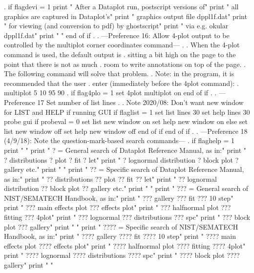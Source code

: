 .
if flagdevi = 1
   print "      After a Dataplot run, postscript versions of"
   print "      all graphics are captured in Dataplot's"
   print "      graphics output file     dppl1f.dat"
   print "      for viewing (and conversion to pdf) by ghostscript"
   print "      via e.g.    okular dppl1f.dat"
   print " "
end of if
.
. ---Preference 16: Allow 4-plot output to be controlled by the    multiplot corner coordinates    command---
.
.    When the 4-plot command is used, the default output is
.    sitting a bit high on the page to the point that there is not as much
.    room to write annotations on top of the page.
.    The following command will solve that problem.
.    Note: in the program, it is recommended that the user
.          enter (immediately before the 4plot command):
.             multiplot 5 10 95 90
.
if flag4plo = 1
   set 4plot multiplot on
end of if
.
. ---Preference 17 Set number of list lines
.
.    Note 2020/08: Don't want new window for LIST and HELP if running GUI
if flaglist = 1
   set list lines 30
   set help lines 30
   probe gui
   if probeval = 0
      set list new window on
      set help new window on
   else
      set list new window off
      set help new window off
   end of if
end of if
.
. ---Preference 18 (4/9/18): Note the question-mark-based search commands---
.
if flaghelp = 1
   print " "
   print "      ? = General  search of Dataplot Reference Manual, as in:"
   print "          ? distributions   ? plot   ? fit   ? let"
   print "          ? lognormal distribution   ? block plot   ? gallery   etc."
   print " "
   print "     ?? = Specific search of Dataplot Reference Manual, as in:"
   print "          ?? distributions   ?? plot   ?? fit   ?? let"
   print "          ?? lognormal distribution    ?? block plot   ?? gallery   etc."
   print " "
   print "    ??? = General  search of NIST/SEMATECH Handbook, as in:"
   print "          ??? gallery   ??? fit   ??? 10 step"
   print "          ??? main effects plot   ??? effects plot"
   print "          ??? halfnormal plot     ??? fitting   ??? 4plot"
   print "          ??? lognormal   ??? distributions   ??? spc"
   print "          ??? block plot  ??? gallery"
   print " "
   print "   ???? = Specific search of NIST/SEMATECH Handbook, as in:"
   print "          ???? gallery   ???? fit   ???? 10 step"
   print "          ???? main effects plot   ???? effects plot"
   print "          ???? halfnormal plot     ???? fitting   ???? 4plot"
   print "          ???? lognormal   ???? distributions   ???? spc"
   print "          ???? block plot   ???? gallery"
   print " "
